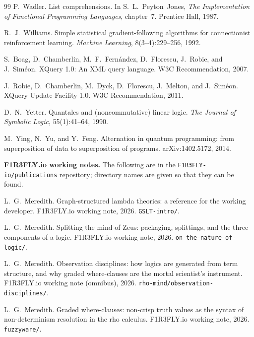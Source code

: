 \documentclass[11pt]{article}
\theoremstyle{definition}
\theoremstyle{plain}
\theoremstyle{remark}
\begin{document}
\begin{thebibliography}{99}
P.~Wadler.
\newblock List comprehensions.
\newblock In S.~L.~Peyton~Jones, \emph{The Implementation of Functional
Programming Languages}, chapter~7. Prentice Hall, 1987.

R.~J.~Williams.
\newblock Simple statistical gradient-following algorithms for connectionist
reinforcement learning.
\newblock \emph{Machine Learning}, 8(3--4):229--256, 1992.

S.~Boag, D.~Chamberlin, M.~F.~Fern\'{a}ndez, D.~Florescu, J.~Robie, and
J.~Sim\'{e}on.
\newblock XQuery 1.0: An XML query language.
\newblock W3C Recommendation, 2007.

J.~Robie, D.~Chamberlin, M.~Dyck, D.~Florescu, J.~Melton, and J.~Sim\'{e}on.
\newblock XQuery Update Facility 1.0.
\newblock W3C Recommendation, 2011.

D.~N.~Yetter.
\newblock Quantales and (noncommutative) linear logic.
\newblock \emph{The Journal of Symbolic Logic}, 55(1):41--64, 1990.

M.~Ying, N.~Yu, and Y.~Feng.
\newblock Alternation in quantum programming: from superposition of data to
superposition of programs.
\newblock arXiv:1402.5172, 2014.

\bigskip
\noindent\textbf{F1R3FLY.io working notes.} The following are in the
\texttt{F1R3FLY-io/publications} repository; directory names are given so that
they can be found.

L.~G.~Meredith.
\newblock Graph-structured lambda theories: a reference for the working
developer.
\newblock F1R3FLY.io working note, 2026. \texttt{GSLT-intro/}.

L.~G.~Meredith.
\newblock Splitting the mind of Zeus: packaging, splittings, and the three
components of a logic.
\newblock F1R3FLY.io working note, 2026. \texttt{on-the-nature-of-logic/}.

L.~G.~Meredith.
\newblock Observation disciplines: how logics are generated from term
structure, and why graded where-clauses are the mortal scientist's instrument.
\newblock F1R3FLY.io working note (omnibus), 2026.
\texttt{rho-mind/observation-disciplines/}.

L.~G.~Meredith.
\newblock Graded where-clauses: non-crisp truth values as the syntax of
non-determinism resolution in the rho calculus.
\newblock F1R3FLY.io working note, 2026. \texttt{fuzzyware/}.


\end{thebibliography}
\end{document}
